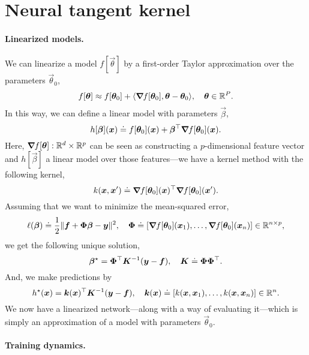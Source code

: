 \section{Neural tangent kernel}

\paragraph{Linearized models.}

We can linearize a model $f[\vec{\theta}]$ by a first-order Taylor approximation over the
parameters $\vec{\theta}_0$, \[
    f[\bm{\theta}] \approx f[\bm{\theta}_0] + \langle \bm{\nabla}_{\! } f[\bm{\theta}_0], \bm{\theta} - \bm{\theta}_0 \rangle, \quad \bm{\theta} \in \mathbb{R}^P.
\]
In this way, we can define a linear model with parameters $\vec{\beta}$, \[
    h[\bm{\beta}](\bm{x}) \doteq f[\bm{\theta}_0](\bm{x}) + \bm{\beta}^\top \bm{\nabla}_{\! } f[\bm{\theta}_0](\bm{x}).
\]
Here, $\bm{\nabla}_{\! } f[\bm{\theta}]: \mathbb{R}^d \times \mathbb{R}^p$ can be seen as constructing a $p$-dimensional
feature vector and $h[\vec{\beta}]$ a linear model over those features---we have a kernel method
with the following kernel, \[
    k(\bm{x}, \bm{x}') \doteq \bm{\nabla}_{\! } f[\bm{\theta}_0](\bm{x})^\top \bm{\nabla}_{\! } f[\bm{\theta}_0](\bm{x}').
\]
Assuming that we want to minimize the mean-squared error, \[
    \ell(\bm{\beta}) \doteq \frac{1}{2} \| \bm{f} + \bm{\Phi} \bm{\beta} - \bm{y} \|^2, \quad \bm{\Phi} \doteq [\bm{\nabla}_{\! } f[\bm{\theta}_0](\bm{x}_1), \ldots, \bm{\nabla}_{\! } f[\bm{\theta}_0](\bm{x}_n)] \in \mathbb{R}^{n \times p},
\]
we get the following unique solution, \[
    \bm{\beta}^\star = \bm{\Phi}^\top \bm{K}^{-1} (\bm{y} - \bm{f}), \quad \bm{K} \doteq \bm{\Phi} \bm{\Phi}^\top.
\]
And, we make predictions by \[
    h^\star(\bm{x}) = \bm{k}(\bm{x})^\top \bm{K}^{-1} (\bm{y} - \bm{f}), \quad \bm{k}(\bm{x}) \doteq [k(\bm{x}, \bm{x}_1), \ldots, k(\bm{x}, \bm{x}_n)] \in \mathbb{R}^n.
\]
We now have a linearized network---along with a way of evaluating it---which is simply an
approximation of a model with parameters $\vec{\theta}_0$.

\paragraph{Training dynamics.}

